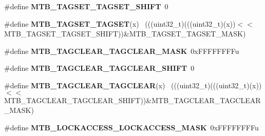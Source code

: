 \begin{DoxyCompactItemize}
\item 
\hypertarget{group___m_t_b___register___masks_gac7d7e704f5b16991586fea0dc061bc3d}{}\#define {\bfseries M\+T\+B\+\_\+\+T\+A\+G\+S\+E\+T\+\_\+\+T\+A\+G\+S\+E\+T\+\_\+\+S\+H\+I\+F\+T}~0\label{group___m_t_b___register___masks_gac7d7e704f5b16991586fea0dc061bc3d}

\item 
\hypertarget{group___m_t_b___register___masks_ga2ad07207b357ce17267bd15b9f964873}{}\#define {\bfseries M\+T\+B\+\_\+\+T\+A\+G\+S\+E\+T\+\_\+\+T\+A\+G\+S\+E\+T}(x)                                      ~(((uint32\+\_\+t)(((uint32\+\_\+t)(x))$<$$<$M\+T\+B\+\_\+\+T\+A\+G\+S\+E\+T\+\_\+\+T\+A\+G\+S\+E\+T\+\_\+\+S\+H\+I\+F\+T))\&M\+T\+B\+\_\+\+T\+A\+G\+S\+E\+T\+\_\+\+T\+A\+G\+S\+E\+T\+\_\+\+M\+A\+S\+K)\label{group___m_t_b___register___masks_ga2ad07207b357ce17267bd15b9f964873}

\item 
\hypertarget{group___m_t_b___register___masks_ga50dabf07ab4f88615242b68c0466aab0}{}\#define {\bfseries M\+T\+B\+\_\+\+T\+A\+G\+C\+L\+E\+A\+R\+\_\+\+T\+A\+G\+C\+L\+E\+A\+R\+\_\+\+M\+A\+S\+K}~0x\+F\+F\+F\+F\+F\+F\+F\+Fu\label{group___m_t_b___register___masks_ga50dabf07ab4f88615242b68c0466aab0}

\item 
\hypertarget{group___m_t_b___register___masks_gac1ba97e3448e183a4d00b63060786290}{}\#define {\bfseries M\+T\+B\+\_\+\+T\+A\+G\+C\+L\+E\+A\+R\+\_\+\+T\+A\+G\+C\+L\+E\+A\+R\+\_\+\+S\+H\+I\+F\+T}~0\label{group___m_t_b___register___masks_gac1ba97e3448e183a4d00b63060786290}

\item 
\hypertarget{group___m_t_b___register___masks_gad2ffe39d56a859c7554f1fc099584c44}{}\#define {\bfseries M\+T\+B\+\_\+\+T\+A\+G\+C\+L\+E\+A\+R\+\_\+\+T\+A\+G\+C\+L\+E\+A\+R}(x)                              ~(((uint32\+\_\+t)(((uint32\+\_\+t)(x))$<$$<$M\+T\+B\+\_\+\+T\+A\+G\+C\+L\+E\+A\+R\+\_\+\+T\+A\+G\+C\+L\+E\+A\+R\+\_\+\+S\+H\+I\+F\+T))\&M\+T\+B\+\_\+\+T\+A\+G\+C\+L\+E\+A\+R\+\_\+\+T\+A\+G\+C\+L\+E\+A\+R\+\_\+\+M\+A\+S\+K)\label{group___m_t_b___register___masks_gad2ffe39d56a859c7554f1fc099584c44}

\item 
\hypertarget{group___m_t_b___register___masks_ga44e6720b612450d08ba896ca1ad61185}{}\#define {\bfseries M\+T\+B\+\_\+\+L\+O\+C\+K\+A\+C\+C\+E\+S\+S\+\_\+\+L\+O\+C\+K\+A\+C\+C\+E\+S\+S\+\_\+\+M\+A\+S\+K}~0x\+F\+F\+F\+F\+F\+F\+F\+Fu\label{group___m_t_b___register___masks_ga44e6720b612450d08ba896ca1ad61185}


\end{DoxyCompactItemize}
